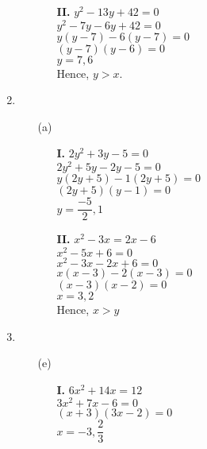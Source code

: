 \begin{multicols}{2}
\begin{enumerate}
\begin{itemize}
\begin{itemize}
    \item[{\bf II.}] $y^2 - 13y + 42 = 0$\\
      $y^2 - 7y - 6y + 42 = 0$\\
      $y(y - 7) -6 (y - 7) = 0$\\
      $(y - 7)(y - 6) = 0$\\
      $y = 7, 6$\\
      Hence, $y > x.$
      \end{itemize}
  \end{itemize}
\item
  \begin{itemize}
  \item[(a)]
    \begin{itemize}
    \item[{\bf I.}] $2y^2 + 3y -5 = 0$\\
      $2y^2 + 5y - 2y - 5 = 0$\\
      $y(2y + 5) -1 (2y + 5) = 0$\\
      $(2y + 5)(y - 1) = 0$\\[0.2cm]
      $y = \dfrac{-5}{2}, 1$

    \item[{\bf II.}] $x^2 - 3x = 2x - 6$\\
      $x^2 - 5x + 6 = 0$\\
      $x^2 - 3x - 2x + 6 = 0$\\
      $x(x - 3) -2(x - 3) = 0$\\
      $(x - 3)(x - 2) = 0$\\
      $x = 3, 2$\\
      Hence, $x > y$
      \end{itemize}
  \end{itemize}
\item
  \begin{itemize}
  \item[(e)]
    \begin{itemize}
    \item[{\bf I.}] $6x^2 + 14x = 12$\\
      $3x^2 + 7x - 6 = 0$\\
      $(x + 3)(3x - 2) = 0$\\[0.2cm]
      $x = -3, \dfrac{2}{3}$


\end{itemize}
\end{itemize}
\end{enumerate}
\end{multicols}
